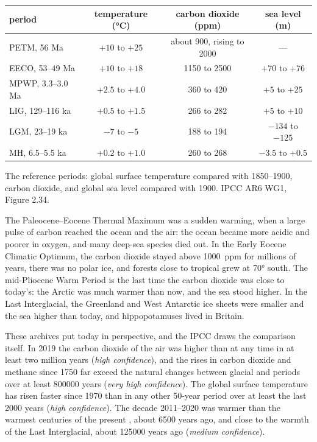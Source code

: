 \begin{center}
\small
\begin{tabular}{|l|c|c|c|}
\hline
\textbf{period} & \textbf{temperature (\unit{\degreeCelsius})} & \textbf{carbon dioxide (ppm)} & \textbf{sea level (m)} \\
\hline
PETM, 56 Ma & $+10$ to $+25$ & about 900, rising to 2000 & --- \\
EECO, 53--49 Ma & $+10$ to $+18$ & 1150 to 2500 & $+70$ to $+76$ \\
MPWP, 3.3--3.0 Ma & $+2.5$ to $+4.0$ & 360 to 420 & $+5$ to $+25$ \\
LIG, 129--116 ka & $+0.5$ to $+1.5$ & 266 to 282 & $+5$ to $+10$ \\
\textcolor{omCold}{LGM, 23--19 ka} & \textcolor{omCold}{$-7$ to $-5$} & \textcolor{omCold}{188 to 194} & \textcolor{omCold}{$-134$ to $-125$} \\
MH, 6.5--5.5 ka & $+0.2$ to $+1.0$ & 260 to 268 & $-3.5$ to $+0.5$ \\
\hline
\end{tabular}

\medskip
{\small The reference periods: global surface temperature compared with
1850--1900, carbon dioxide, and global sea level compared with 1900. IPCC
AR6 WG1, Figure 2.34.}
\end{center}

The Paleocene--Eocene Thermal Maximum was a sudden warming, when a large
pulse of carbon reached the ocean and the air: the ocean became more acidic
and poorer in oxygen, and many deep-sea species died out. In the Early Eocene
Climatic Optimum, the carbon dioxide stayed above \qty{1000}{ppm} for
millions of years, there was no polar ice, and forests close to tropical grew
at \ang{70} south. The mid-Pliocene Warm Period is the last time the carbon
dioxide was close to today's: the Arctic was much warmer than now, and the sea
stood higher. In the Last Interglacial, the Greenland and West Antarctic ice
sheets were smaller and the sea higher than today, and hippopotamuses lived
in Britain.

These archives put today in perspective, and the IPCC draws the comparison
itself. In 2019 the carbon dioxide of the air was higher than at any time in
at least two million years (\emph{high confidence}), and the rises in carbon
dioxide and methane since 1750 far exceed the natural changes between glacial
and  periods over at least \num{800000} years (\emph{very high
confidence}). The global surface temperature has risen faster since 1970 than
in any other 50-year period over at least the last \num{2000} years
(\emph{high confidence}). The decade 2011--2020 was warmer than the warmest
centuries of the present , about \num{6500} years ago, and close
to the warmth of the Last Interglacial, about \num{125000} years ago
(\emph{medium confidence}).

